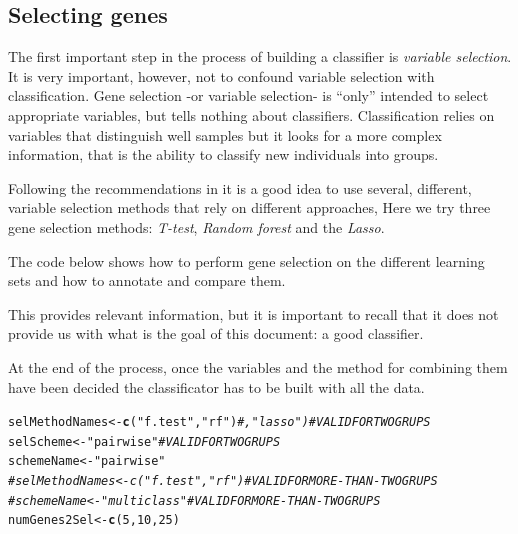 \documentclass{article}\usepackage[]{graphicx}\usepackage[]{color}
\makeatletter
\newcommand{\hlnum}[1]{\textcolor[rgb]{0.686,0.059,0.569}{#1}}%
\newcommand{\hlstr}[1]{\textcolor[rgb]{0.192,0.494,0.8}{#1}}%
\newcommand{\hlcom}[1]{\textcolor[rgb]{0.678,0.584,0.686}{\textit{#1}}}%
\newcommand{\hlstd}[1]{\textcolor[rgb]{0.345,0.345,0.345}{#1}}%
\newcommand{\hlkwb}[1]{\textcolor[rgb]{0.69,0.353,0.396}{#1}}%
\newcommand{\hlkwd}[1]{\textcolor[rgb]{0.737,0.353,0.396}{\textbf{#1}}}%
\newenvironment{kframe}{%
 \def\at@end@of@kframe{}%
 \ifinner\ifhmode%
  \def\at@end@of@kframe{\end{minipage}}%
  \begin{minipage}{\columnwidth}%
 \fi\fi%
 \def\FrameCommand##1{\hskip\@totalleftmargin \hskip-\fboxsep
 \colorbox{shadecolor}{##1}\hskip-\fboxsep
     \hskip-\linewidth \hskip-\@totalleftmargin \hskip\columnwidth}%
 \MakeFramed {\advance\hsize-\width
   \@totalleftmargin\z@ \linewidth\hsize
   \@setminipage}}%
 {\par\unskip\endMakeFramed%
 \at@end@of@kframe}
\newenvironment{knitrout}{}{} %
\makeatother
\begin{document}
\subsection{Selecting genes}

The first important step in the process of building a classifier is \emph{variable selection}. It is very important, however, not to confound variable selection with classification. Gene selection -or variable selection- is ``only'' intended to select appropriate variables, but tells nothing about classifiers. Classification relies on variables that distinguish well samples but it looks for a more complex information, that is the ability to classify new individuals into groups.

Following the recommendations in \cite{Boulesteix2008} it is a good idea to use several, different, variable selection methods that rely on different approaches, Here we try three  gene selection methods: \emph{T-test}, \emph{Random forest} and the \emph{Lasso}.

The code below shows how to perform gene selection on the different learning sets and how to annotate and compare them.

This provides relevant information, but it is important to recall that it does not provide us with what is the goal of this document: a good classifier.

At the end of the process, once the variables and the method for combining them have been decided the classificator has to be built with all the data.



\begin{knitrout}
\color{fgcolor}\begin{kframe}
\begin{alltt}
\hlstd{selMethodNames} \hlkwb{<-} \hlkwd{c}\hlstd{(}\hlstr{"f.test"}\hlstd{,} \hlstr{"rf"}\hlstd{)} \hlcom{# , "lasso") # VALID FOR TWO GRUPS}
\hlstd{selScheme} \hlkwb{<-} \hlstr{"pairwise"}                       \hlcom{# VALID FOR TWO GRUPS}
\hlstd{schemeName} \hlkwb{<-} \hlstr{"pairwise"}
\hlcom{# selMethodNames <- c("f.test", "rf")            # VALID FOR MORE-THAN-TWO GRUPS}
\hlcom{# schemeName <- "multiclass"                     # VALID FOR MORE-THAN-TWO GRUPS}
\hlstd{numGenes2Sel} \hlkwb{<-} \hlkwd{c}\hlstd{(}\hlnum{5}\hlstd{,} \hlnum{10}\hlstd{,} \hlnum{25}\hlstd{)}
\end{alltt}
\end{kframe}
\end{knitrout}
\end{document}
